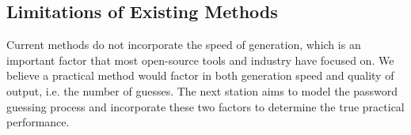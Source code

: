 %


\subsection{Limitations of Existing Methods}
Current methods do not incorporate the speed of generation, which is an important factor that most open-source tools and industry have focused on. We believe a practical method would factor in both generation speed and quality of output, i.e. the number of guesses. The next station aims to model the password guessing process and incorporate these two factors to determine the true practical performance.
